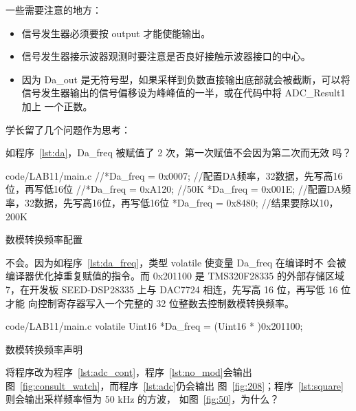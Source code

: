 \documentclass[../main]{subfiles}
\begin{document}
一些需要注意的地方：

\begin{itemize}
  \item 信号发生器必须要按 output 才能使能输出。
  \item 信号发生器接示波器观测时要注意是否良好接触示波器接口的中心。
  \item 因为 Da\_out 是无符号型，如果采样到负数直接输出底部就会被截断，可以将
    信号发生器输出的信号偏移设为峰峰值的一半，或在代码中将 ADC\_Result1 加上
    一个正数。
\end{itemize}

学长留了几个问题作为思考：

\begin{Exercise}
  如程序~\ref{lst:da}，Da\_freq 被赋值了 2 次，第一次赋值不会因为第二次而无效
  吗？
\end{Exercise}

\begin{listing}[htbp]
  \centering
\begin{langPyOne}[c][firstnumber = 74]{code/LAB11/main.c}
    //*Da_freq = 0x0007;   //配置DA频率，32数据，先写高16位，再写低16位
    //*Da_freq = 0xA120;   //50K
    *Da_freq = 0x001E;   //配置DA频率，32数据，先写高16位，再写低16位
    *Da_freq = 0x8480;   //结果要除以10，200K
\end{langPyOne}
  \caption{数模转换频率配置}%
  \label{lst:da}
\end{listing}

\begin{Answer}
  不会。因为如程序~\ref{lst:da_freq}，类型 volatile 使变量 Da\_freq 在编译时不
  会被编译器优化掉重复赋值的指令。而 0x201100 是 TMS320F28335 的外部存储区域
  7，在开发板 SEED-DSP28335 上与 DAC7724 相连，先写高 16 位，再写低 16 位才能
  向控制寄存器写入一个完整的 32 位整数去控制数模转换频率。
\end{Answer}

\begin{listing}[htbp]
  \centering
\begin{langPyOne}[c][firstnumber = 21]{code/LAB11/main.c}
volatile Uint16  *Da_freq      = (Uint16 * )0x201100;
\end{langPyOne}
  \caption{数模转换频率声明}%
  \label{lst:da_freq}
\end{listing}

\begin{Exercise}
  将程序改为程序~\ref{lst:adc_cont}，程序~\ref{lst:no_mod}会输出
  图~\ref{fig:consult_watch}，而程序~\ref{lst:adc}仍会输出
  图~\ref{fig:208}；程序~\ref{lst:square}则会输出采样频率恒为 50 kHz 的方波，
  如图~\ref{fig:50}，为什么？
\end{Exercise}
\end{document}
